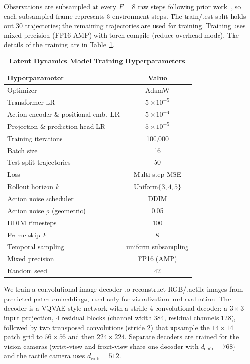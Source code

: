   Observations are subsampled at every $F{=}8$ raw steps following prior work~\cite{sun2026latent}, so each subsampled
  frame represents 8 environment steps.
  The train/test split holds out 30 trajectories; the remaining trajectories are used for training.
  Training uses mixed-precision (FP16 AMP) with torch compile (reduce-overhead mode). The details of the training are in Table~\ref{tab:latent_dyn_training}.

  \begin{table}[h]
  \centering
  \caption{\textbf{Latent Dynamics Model Training Hyperparameters}.}
  \label{tab:wm_train}
  \begin{tabular}{lc}
  \toprule
  \textbf{Hyperparameter} & \textbf{Value} \\
  \midrule
  Optimizer                          & AdamW \\
  Transformer LR                     & $5{\times}10^{-5}$ \\
  Action encoder \& positional emb.\ LR & $5{\times}10^{-4}$ \\
  Projection \& prediction head LR   & $5{\times}10^{-5}$ \\
  Training iterations                & 100{,}000 \\
  Batch size                         & 16 \\
  Test split trajectories            & 50 \\
  Loss                               & Multi-step MSE \\
  Rollout horizon $k$                & Uniform$\{3,4,5\}$ \\
  Action noise scheduler             & DDIM \\
  Action noise $p$ (geometric)       & 0.05 \\
  DDIM timesteps                     & 100 \\
  Frame skip $F$                     & 8 \\
  Temporal sampling                  & uniform subsampling \\
  Mixed precision                    & FP16 (AMP) \\
  Random seed                        & 42 \\
  \bottomrule
  \end{tabular}
  \label{tab:latent_dyn_training}
  \end{table}

  We train a convolutional image decoder to reconstruct RGB/tactile images from predicted patch
  embeddings, used only for visualization and evaluation.
  The decoder is a VQVAE-style network  with a stride-4
  convolutional decoder: a $3{\times}3$ input projection, 4 residual blocks (channel width 384,
  residual channels 128), followed by two transposed convolutions (stride 2) that upsample the
  $14{\times}14$ patch grid to $56{\times}56$ and then $224{\times}224$.
  Separate decoders are trained for the vision cameras (wrist-view and front-view share one decoder with
  $d_{\text{emb}}{=}768$) and the tactile camera uses $d_{\text{emb}}{=}512$.

